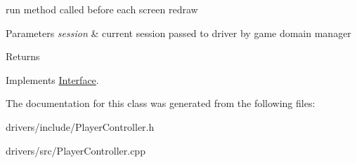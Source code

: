 run method called before each screen redraw 


\begin{DoxyParams}{Parameters}
{\em session} & current session passed to driver by game domain manager \\
\hline
\end{DoxyParams}
\begin{DoxyReturn}{Returns}

\end{DoxyReturn}


Implements \hyperlink{classInterface_addff25eb2adf4221c2be4895597b49c1}{Interface}.



The documentation for this class was generated from the following files\+:\begin{DoxyCompactItemize}
\item 
drivers/include/Player\+Controller.\+h\item 
drivers/src/Player\+Controller.\+cpp\end{DoxyCompactItemize}
